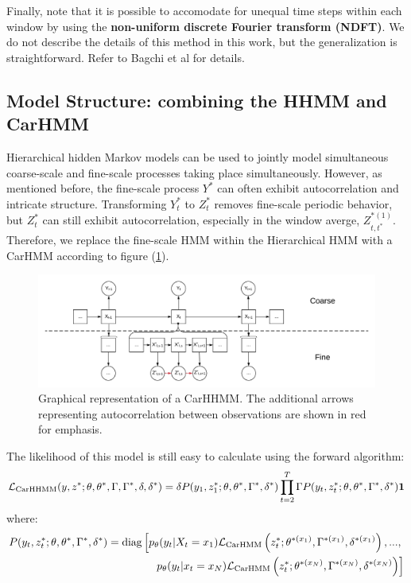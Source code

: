 Finally, note that it is possible to accomodate for unequal time steps within each window by using the \textbf{non-uniform discrete Fourier transform (NDFT)}. We do not describe the details of this method in this work, but the generalization is straightforward. Refer to Bagchi et al \cite{Bagchi:2001} for details.


\subsection{Model Structure: combining the HHMM and CarHMM}

Hierarchical hidden Markov models can be used to jointly model simultaneous coarse-scale and fine-scale processes taking place simultaneously. However, as mentioned before, the fine-scale process $Y^*$ can often exhibit autocorrelation and intricate structure. Transforming $Y^*_t$ to $Z^*_t$ removes fine-scale periodic behavior, but $Z^*_t$ can still exhibit autocorrelation, especially in the window averge, $Z_{t,t^*}^{*(1)}$. Therefore, we replace the fine-scale HMM within the Hierarchical HMM with a CarHMM according to figure (\ref{fig:CarHHMM}).

\begin{figure}[h!]
	\centering
	\includegraphics[width=7.5in]{../../Plots/CarHHMM.png}
	\caption{Graphical representation of a CarHHMM. The additional arrows representing autocorrelation between observations are shown in red for emphasis.}
	\label{fig:CarHHMM}
\end{figure}

The likelihood of this model is still easy to calculate using the forward algorithm:
%
$$\mathcal{L}_{\text{CarHHMM}}(y,z^*;\theta,\theta^*,\Gamma,\Gamma^*,\delta,\delta^*) = \delta P(y_1,z_1^*;\theta,\theta^*,\Gamma^*,\delta^*) \prod_{t=2}^T \Gamma P(y_t,z_t^*;\theta,\theta^*,\Gamma^*,\delta^*) \mathbf{1}$$
%
where:
%
\begin{align*}
P(y_t,z_t^*;\theta,\theta^*,\Gamma^*,\delta^*)  = \text{diag}\left[p_{\theta}(y_t|X_t = x_1)\mathcal{L}_{\text{CarHMM}}\left(z_t^*;\theta^{*(x_1)},\Gamma^{*(x_1)},\delta^{*(x_1)}\right), . . . , \right.\\
\left. p_{\theta}(y_t|x_t = x_N )\mathcal{L}_{\text{CarHMM}}\left(z_t^*;\theta^{*(x_N)},\Gamma^{*(x_N)},\delta^{*(x_N)}\right) \right]
\end{align*}
%